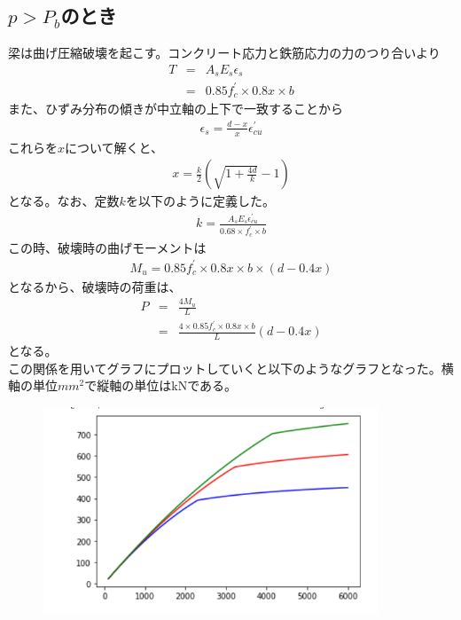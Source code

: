 \documentclass[pdflatex,ja=standard,fleqn]{bxjsarticle}
\begin{document}
\subsection{$p>P_{b}$のとき}
梁は曲げ圧縮破壊を起こす。コンクリート応力と鉄筋応力の力のつり合いより
\begin{eqnarray*}
    T&=&A_{s}E_{s}\epsilon_{s}\\
    &=&0.85f^{\prime}_{c}\times 0.8x\times b
\end{eqnarray*}
また、ひずみ分布の傾きが中立軸の上下で一致することから
\begin{eqnarray*}
    \epsilon_{s}=\frac{d-x}{x}\epsilon^{\prime}_{cu}
\end{eqnarray*}
これらを$x$について解くと、
\begin{eqnarray*}
    x=\frac{k}{2}(\sqrt{1+\frac{4d}{k}}-1)
\end{eqnarray*}
となる。なお、定数$k$を以下のように定義した。
\begin{eqnarray*}
    k=\frac{A_{s}E_{s}\epsilon^{\prime}_{cu}}{0.68\times f^{\prime}_{c}\times b}
\end{eqnarray*}
この時、破壊時の曲げモーメントは
\begin{eqnarray*}
    M_{u}=0.85f^{\prime}_{c}\times 0.8x\times b\times (d-0.4x)
\end{eqnarray*}
となるから、破壊時の荷重は、
\begin{eqnarray*}
    P&=&\frac{4M_{u}}{L}\\
    &=&\frac{4\times 0.85f^{\prime}_{c}\times 0.8x\times b}{L}(d-0.4x)
\end{eqnarray*}
となる。\\
この関係を用いてグラフにプロットしていくと以下のようなグラフとなった。横軸の単位$mm^2$で縦軸の単位はkNである。
\begin{figure}[htbp]
    \centering
    \includegraphics[width=10cm]{2023-01-16.png}
\end{figure}
\end{document}
